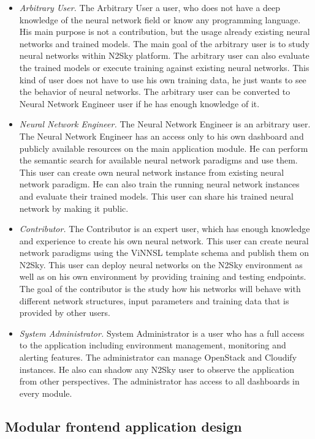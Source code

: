 \documentclass[10pt, conference, compsocconf]{IEEEtran}
\begin{document}
\begin{itemize}
\item \emph{Arbitrary User.}  The Arbitrary User a user, who does not have a deep knowledge of the neural network field or know any programming language. His main purpose is not a contribution, but the usage already existing neural networks and trained models. The main goal of the arbitrary user is to study neural networks within N2Sky platform. The arbitrary user can also evaluate the trained models or execute training against existing neural networks. This kind of user does not have to use his own training data, he just wants to see the behavior of neural networks. The arbitrary user can be converted to Neural Network Engineer user if he has enough knowledge of it. 
\item \emph{Neural Network Engineer.} The Neural Network Engineer is an arbitrary user. The Neural Network Engineer has an access only to his own dashboard and publicly available resources on the main application module. He can perform the semantic search for available neural network paradigms and use them. This user can create own neural network instance from existing neural network paradigm. He can also train the running neural network instances and evaluate their trained models. This user can share his trained neural network by making it public. 
\item \emph{Contributor.} The Contributor is an expert user, which has enough knowledge and experience to create his own neural network. This user can create neural network paradigms using the ViNNSL template schema \cite{Beran2008} and publish them on N2Sky. This user can deploy neural networks on the N2Sky environment as well as on his own environment by providing training and testing endpoints. The goal of the contributor is the study how his networks will behave with different network structures, input parameters and training data that is provided by other users.
\item \emph{System Administrator.} System Administrator is a user who has a full access to the application including environment management, monitoring and alerting features. The administrator can manage OpenStack and Cloudify instances. He also can shadow any N2Sky user to observe the application from other perspectives. The administrator has access to all dashboards in every module.
\end{itemize}



\subsection{Modular frontend application design}
\label{Modular frontend application design}
\end{document}
